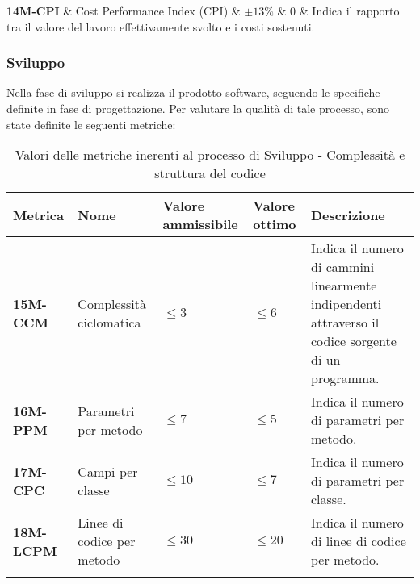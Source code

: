 \begin{longtable}
	\hline
	\textbf{14M-CPI} & Cost Performance Index (CPI)  & $\pm 13\%$                                                  & 0                                         & Indica il rapporto tra il valore del lavoro effettivamente svolto e i costi sostenuti.                                         \\
	\hline
	\caption{Valori delle metriche inerenti al processo di Fornitura}
	\label{table:4}
\end{longtable}

\subsubsection{Sviluppo}
Nella fase di sviluppo si realizza il prodotto software, seguendo le specifiche definite in fase di progettazione.
Per valutare la qualità di tale processo, sono state definite le seguenti metriche:
\begin{longtable}{|>{\raggedright\arraybackslash}m{}|>{\raggedright\arraybackslash}m{}|>{\raggedright\arraybackslash}m{}|>{\raggedright\arraybackslash}m{}|>{\raggedright\arraybackslash}m{}|}
	\hline
	\textbf{Metrica}  & \textbf{Nome}              & \textbf{Valore ammissibile} & \textbf{Valore ottimo} & \textbf{Descrizione}                                                                                \\
	\hline
	\endhead
	\textbf{15M-CCM}  & Complessità ciclomatica    & $\leq 3$                    & $\leq 6$               & Indica il numero di cammini linearmente indipendenti attraverso il codice sorgente di un programma. \\
	\hline
	\textbf{16M-PPM}  & Parametri per metodo       & $\leq 7$                    & $\leq 5$               & Indica il numero di parametri per metodo.                                                           \\
	\hline
	\textbf{17M-CPC}  & Campi per classe           & $\leq 10$                   & $\leq 7$               & Indica il numero di parametri per classe.                                                           \\
	\hline
	\textbf{18M-LCPM} & Linee di codice per metodo & $\leq 30$                   & $\leq 20$              & Indica il numero di linee di codice per metodo.                                                     \\
	\hline
	\caption{ Valori delle metriche inerenti al processo di Sviluppo - Complessità e struttura del codice}
	\label{table:5}
\end{longtable}

